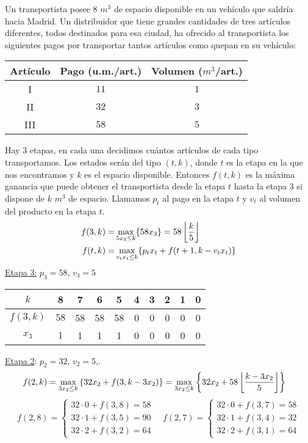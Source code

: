 \documentclass[twoside]{article}
\begin{document}
\newpage 
\begin{ejercicio}{2}
Un transportista posee $8$ $m^3$ de espacio disponible en un vehículo que saldría hacia Madrid.
Un distribuidor que tiene grandes cantidades de tres artículos diferentes, todos destinados para
esa ciudad, ha ofrecido al transportista los siguientes pagos por transportar tantos artículos como
quepan en su vehículo:
\begin{center}

\begin{tabular}{c| c| c}
Artículo & Pago (u.m./art.) & Volumen ($m^3$/art.)\\
\hline
I & $11$ & $1$\\
II& $32$& $3$\\
III& $58$ & $5$\\

\end{tabular}
\end{center}

\begin{solucion}
Hay $3$ etapas, en cada una decidimos cuántos artículos de cada tipo transportamos. Los estados serán del tipo $(t,k)$, donde $t$ es la etapa en la que nos encontramos y $k$ es el espacio disponible. Entonces $f(t,k)$ es la máxima ganancia que puede obtener el transportista desde la etapa $t$ hasta la etapa $3$ si dispone de $k$ $m^3$ de espacio. Llamamos $p_t$ al pago en la etapa $t$ y $v_t$ al volumen del producto en la etapa $t$. 
\begin{align*}
f(3,k)=&\max_{5x_3\leq k}\{58x_3\}=58\left\lfloor{\frac{k}{5}}\right\rfloor\\
f(t,k)=&\max_{v_tx_t\leq k}\{p_tx_t+f(t+1,k-v_tx_t)\}
\end{align*}
\underline{Etapa 3:} $p_3=58$, $v_3=5$\
\begin{center}
\begin{tabular}{c| c c c c c c c c c}
$k$ & 8 & 7 & 6 & 5 & 4 & 3 & 2 & 1 & 0\\
\hline
$f(3,k)$ & $58$ & 58 & 58 & 58 & 0 & 0 & 0 & 0 & 0\\
$x_3$ &  $1$ & 1 & 1 & 1& 0 & 0 & 0 & 0 & 0
\end{tabular}
\end{center}
\underline{Etapa 2}: $p_2=32$, $v_2=5$,.
\begin{align*}
f(2,k)&=\max_{3x_2\leq k}{\left\{32x_2+f(3,k-3x_2)\right\}} = \max_{3x_2\leq k}{\left\{32x_2+58\left\lfloor{\frac{k-3x_2}{5}}\right\rfloor\right\}}
\end{align*}
$$f(2,8)=\begin{cases}
32\cdot 0+f(3,8)=58\\
32\cdot 1+f(3,5)=90\\
32\cdot 2+f(3,2)=64
\end{cases}\quad f(2,7)=\begin{cases}
32\cdot 0+f(3,7)=58\\
32\cdot 1+f(3,4)=32\\
32\cdot 2+f(3,1)=64
\end{cases}$$


\end{solucion}
\end{ejercicio}
\end{document}
